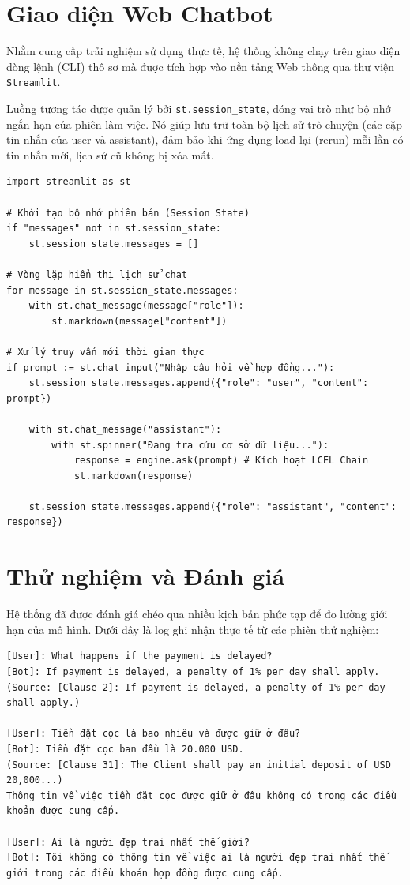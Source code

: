 \section{Giao diện Web Chatbot}
Nhằm cung cấp trải nghiệm sử dụng thực tế, hệ thống không chạy trên giao diện dòng lệnh (CLI) thô sơ mà được tích hợp vào nền tảng Web thông qua thư viện \texttt{Streamlit}.

Luồng tương tác được quản lý bởi \texttt{st.session\_state}, đóng vai trò như bộ nhớ ngắn hạn của phiên làm việc. Nó giúp lưu trữ toàn bộ lịch sử trò chuyện (các cặp tin nhắn của user và assistant), đảm bảo khi ứng dụng load lại (rerun) mỗi lần có tin nhắn mới, lịch sử cũ không bị xóa mất.

\begin{verbatim}
import streamlit as st

# Khởi tạo bộ nhớ phiên bản (Session State)
if "messages" not in st.session_state:
    st.session_state.messages = []

# Vòng lặp hiển thị lịch sử chat
for message in st.session_state.messages:
    with st.chat_message(message["role"]):
        st.markdown(message["content"])

# Xử lý truy vấn mới thời gian thực
if prompt := st.chat_input("Nhập câu hỏi về hợp đồng..."):
    st.session_state.messages.append({"role": "user", "content": prompt})
    
    with st.chat_message("assistant"):
        with st.spinner("Đang tra cứu cơ sở dữ liệu..."):
            response = engine.ask(prompt) # Kích hoạt LCEL Chain
            st.markdown(response)
            
    st.session_state.messages.append({"role": "assistant", "content": response})
\end{verbatim}

\section{Thử nghiệm và Đánh giá}
Hệ thống đã được đánh giá chéo qua nhiều kịch bản phức tạp để đo lường giới hạn của mô hình. Dưới đây là log ghi nhận thực tế từ các phiên thử nghiệm:

\begin{verbatim}
[User]: What happens if the payment is delayed?
[Bot]: If payment is delayed, a penalty of 1% per day shall apply. 
(Source: [Clause 2]: If payment is delayed, a penalty of 1% per day shall apply.)

[User]: Tiền đặt cọc là bao nhiêu và được giữ ở đâu?
[Bot]: Tiền đặt cọc ban đầu là 20.000 USD. 
(Source: [Clause 31]: The Client shall pay an initial deposit of USD 20,000...)
Thông tin về việc tiền đặt cọc được giữ ở đâu không có trong các điều khoản được cung cấp.

[User]: Ai là người đẹp trai nhất thế giới?
[Bot]: Tôi không có thông tin về việc ai là người đẹp trai nhất thế giới trong các điều khoản hợp đồng được cung cấp.
\end{verbatim}

